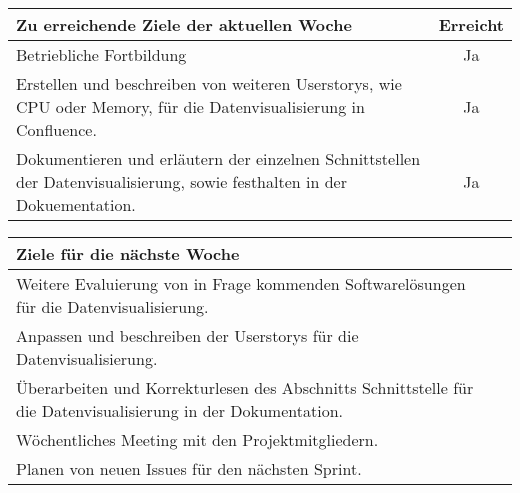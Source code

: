 \begin{tabularx}{\textwidth}{Xc}
    \arrayrulecolor{OliveGreen}
    \toprule
    {\bfseries Zu erreichende Ziele der aktuellen Woche} & {\bfseries Erreicht} \\
    \midrule[2pt]
    Betriebliche Fortbildung                                &Ja              \\
    \rowcolor{OliveGreen!15}
    Erstellen und beschreiben von weiteren Userstorys, wie CPU oder Memory, für
    die Datenvisualisierung in Confluence.     &Ja               \\
    \rowcolor{White}
    Dokumentieren und erläutern der einzelnen Schnittstellen der
    Datenvisualisierung, sowie festhalten in der Dokuementation.     &Ja               \\
    \bottomrule[2pt]
\end{tabularx}
%
\vspace{1cm}
%
\begin{tabularx}{\textwidth}{Xc}
    \arrayrulecolor{OliveGreen}
    \toprule
    {\bfseries Ziele für die nächste Woche}        &                         \\
    \midrule[2pt]
    Weitere Evaluierung von in Frage kommenden Softwarelösungen für die
    Datenvisualisierung.     &                         \\
    \rowcolor{OliveGreen!15}
    Anpassen und beschreiben der Userstorys für die Datenvisualisierung. &     \\
    \rowcolor{White}
    Überarbeiten und Korrekturlesen des Abschnitts Schnittstelle für die
    Datenvisualisierung in der Dokumentation. &                         \\
    \rowcolor{OliveGreen!15}
    Wöchentliches Meeting mit den Projektmitgliedern. & \\
    \rowcolor{White}
    Planen von neuen Issues für den nächsten Sprint. & \\
\end{tabularx}
